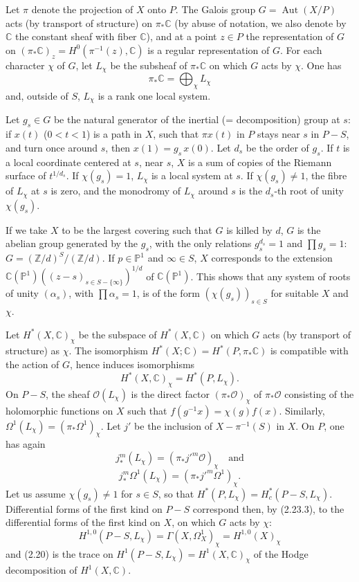 \documentclass[12pt,a4paper]{article}
\theoremstyle{plain}
\theoremstyle{definition}
\theoremstyle{remark}
\DeclareMathOperator{\Aut}{Aut}
\newcommand{\CC}{\mathbb{C}}
\newcommand{\PP}{\mathbb{P}}
\newcommand{\ZZ}{\mathbb{Z}}
\numberwithin{equation}{section}
\providecommand{\CC}{\mathbb{C}}
\providecommand{\PP}{\mathbb{P}}
\providecommand{\ZZ}{\mathbb{Z}}
\providecommand{\Aut}{\operatorname{Aut}}
\begin{document}
Let $\pi$ denote the projection of $X$ onto $P$. The Galois group $G = \Aut(X/P)$ acts (by transport of structure) on $\pi_*\CC$ (by abuse of notation, we also denote by $\CC$ the constant sheaf with fiber $\CC$), and at a point $z \in P$ the representation of $G$ on $(\pi_*\CC)_z = H^0(\pi^{-1}(z), \CC)$ is a regular representation of $G$. For each character $\chi$ of $G$, let $L_\chi$ be the subsheaf of $\pi_*\CC$ on which $G$ acts by $\chi$. One has
\[
\pi_*\CC = \bigoplus_\chi L_\chi
\]
and, outside of $S$, $L_\chi$ is a rank one local system.

Let $g_s \in G$ be the natural generator of the inertial (= decomposition) group at $s$: if $x(t)$ ($0 < t < 1$) is a path in $X$, such that $\pi x(t)$ in $P$ stays near $s$ in $P-S$, and turn once around $s$, then $x(1) = g_s \, x(0)$. Let $d_s$ be the order of $g_s$. If $t$ is a local coordinate centered at $s$, near $s$, $X$ is a sum of copies of the Riemann surface of $t^{1/d_s}$. If $\chi(g_s) = 1$, $L_\chi$ is a local system at $s$. If $\chi(g_s) \neq 1$, the fibre of $L_\chi$ at $s$ is zero, and the monodromy of $L_\chi$ around $s$ is the $d_s$-th root of unity $\chi(g_s)$.

If we take $X$ to be the largest covering such that $G$ is killed by $d$, $G$ is the abelian group generated by the $g_s$, with the only relations $g_s^{d_s} = 1$ and $\prod g_s = 1$: $G = (\ZZ/d)^S/(\ZZ/d)$. If $p \in \PP^1$ and $\infty \in S$, $X$ corresponds to the extension $\CC(\PP^1)((z-s)_{s \in S - \{\infty\}})^{1/d}$ of $\CC(\PP^1)$. This shows that any system of roots of unity $(\alpha_s)$, with $\prod \alpha_s = 1$, is of the form $(\chi(g_s))_{s \in S}$ for suitable $X$ and $\chi$.

Let $H^*(X, \CC)_\chi$ be the subspace of $H^*(X, \CC)$ on which $G$ acts (by transport of structure) as $\chi$. The isomorphism $H^*(X; \CC) = H^*(P, \pi_*\CC)$ is compatible with the action of $G$, hence induces isomorphisms
\begin{equation}\label{eq:2.23.1}
H^*(X, \CC)_\chi = H^*(P, L_\chi).
\end{equation}
On $P-S$, the sheaf $\mathcal{O}(L_\chi)$ is the direct factor $(\pi_*\mathcal{O})_\chi$ of $\pi_*\mathcal{O}$ consisting of the holomorphic functions on $X$ such that $f(g^{-1}x) = \chi(g)f(x)$. Similarly, $\Omega^1(L_\chi) = (\pi_*\Omega^1)_\chi$. Let $j'$ be the inclusion of $X - \pi^{-1}(S)$ in $X$. On $P$, one has again
\begin{equation}\label{eq:2.23.2}
j_*^m(L_\chi) = (\pi_*j'^m\mathcal{O})_\chi \quad \text{and}
\end{equation}
\begin{equation}\label{eq:2.23.3}
j_*^m\Omega^1(L_\chi) = (\pi_*j'^m\Omega^1)_\chi.
\end{equation}
Let us assume $\chi(g_s) \neq 1$ for $s \in S$, so that $H^*(P, L_\chi) = H^*_c(P-S, L_\chi)$. Differential forms of the first kind on $P-S$ correspond then, by (2.23.3), to the differential forms of the first kind on $X$, on which $G$ acts by $\chi$:
\[
H^{1,0}(P-S, L_\chi) = \Gamma(X, \Omega^1_X)_\chi = H^{1,0}(X)_\chi
\]
and (2.20) is the trace on $H^1(P-S, L_\chi) = H^1(X, \CC)_\chi$ of the Hodge decomposition of $H^1(X, \CC)$.
\end{document}
